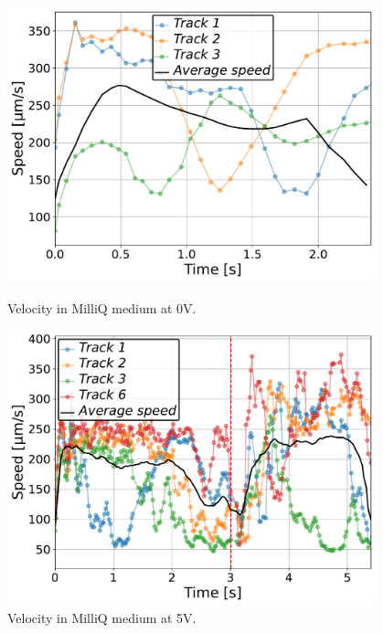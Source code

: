 \begin{figure}[H]
    \centering
    \begin{minipage}[t]{0.49\textwidth}
        \centering
        \includegraphics[width=0.95\textwidth]{Figures/MQ_0V_001_velocity_time.pdf}
        \caption{Velocity in MilliQ medium at 0V.}
        \label{fig:velocity_time_MQ_0V}
    \end{minipage}
    \hfill
    \begin{minipage}[t]{0.49\textwidth}
        \centering
        \includegraphics[width=0.95\textwidth]{Figures/MQ_5V_001_velocity_time.pdf}
        \caption{Velocity in MilliQ medium at 5V.}
        \label{fig:velocity_time_MQ_5V}
    \end{minipage}
\end{figure}

